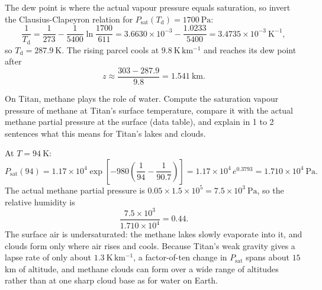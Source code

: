 \begin{solution}
The dew point is where the actual vapour pressure equals saturation, so invert the Clausius-Clapeyron relation for $P_{\mathrm{sat}}(T_{\mathrm{d}}) = 1700\ \mathrm{Pa}$:
\[
  \frac{1}{T_{\mathrm{d}}} = \frac{1}{273} - \frac{1}{5400} \ln\!\frac{1700}{611}
                           = 3.6630 \times 10^{-3} - \frac{1.0233}{5400}
                           = 3.4735 \times 10^{-3}\ \mathrm{K^{-1}},
\]
so $T_{\mathrm{d}} = 287.9\ \mathrm{K}$.
The rising parcel cools at $9.8\ \mathrm{K\,km^{-1}}$ and reaches its dew point after
\[
  z \approx \frac{303 - 287.9}{9.8} = 1.541\ \mathrm{km}.
\]
\end{solution}

\parti {} On Titan, methane plays the role of water.
Compute the saturation vapour pressure of methane at Titan's surface temperature, compare it with the actual methane partial pressure at the surface (data table), and explain in 1 to 2 sentences what this means for Titan's lakes and clouds.

\begin{solution}
At $T = 94\ \mathrm{K}$:
\[
  P_{\mathrm{sat}}(94) = 1.17 \times 10^{4} \exp\!\left[ -980 \left( \frac{1}{94} - \frac{1}{90.7} \right) \right]
                       = 1.17 \times 10^{4}\, e^{0.3793}
                       = 1.710 \times 10^{4}\ \mathrm{Pa}.
\]
The actual methane partial pressure is $0.05 \times 1.5 \times 10^{5} = 7.5 \times 10^{3}\ \mathrm{Pa}$, so the relative humidity is
\[
  \frac{7.5 \times 10^{3}}{1.710 \times 10^{4}} = 0.44.
\]
The surface air is undersaturated: the methane lakes slowly evaporate into it, and clouds form only where air rises and cools.
Because Titan's weak gravity gives a lapse rate of only about $1.3\ \mathrm{K\,km^{-1}}$, a factor-of-ten change in $P_{\mathrm{sat}}$ spans about $15$ km of altitude, and methane clouds can form over a wide range of altitudes rather than at one sharp cloud base as for water on Earth.
\end{solution}



